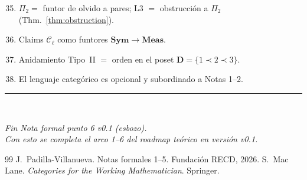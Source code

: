 \documentclass[11pt,a4paper]{article}
\theoremstyle{definition}
\theoremstyle{plain}
\theoremstyle{remark}
\begin{document}
\begin{enumerate}[label=\textbf{C\arabic*.}]
  \setcounter{enumi}{34}
  \item $\Pi_2=$ funtor de olvido a pares; L3 $=$ obstrucci\'on a
  $\Pi_2$ (Thm.~\ref{thm:obstruction}).
  \item Claims $\mathcal{C}_\ell$ como funtores $\mathbf{Sym}\to\mathbf{Meas}$.
  \item Anidamiento Tipo~II $=$ orden en el poset $\mathbf{D}=\{1\prec 2\prec 3\}$.
  \item El lenguaje categ\'orico es opcional y subordinado a Notas 1--2.
\end{enumerate}

\vspace{1.5em}
\noindent\rule{\textwidth}{0.4pt}\\[0.5em]
\begin{center}
\em Fin Nota formal punto 6 v0.1 (esbozo).\\
Con esto se completa el arco 1--6 del roadmap te\'orico en versi\'on v0.1.
\end{center}

\begin{thebibliography}{99}
J.~Padilla-Villanueva. Notas formales 1--5. Fundaci\'on RECD, 2026.
S.~Mac Lane. \emph{Categories for the Working Mathematician}. Springer.
\end{thebibliography}
\end{document}
